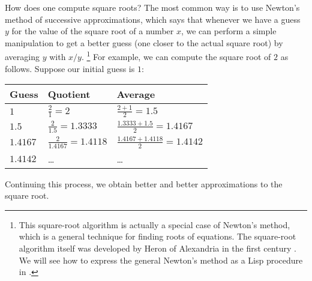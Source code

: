 How does one compute square roots?
The most common way is to use Newton’s method of successive approximations, which says that whenever we have a guess \( y \) for the value of the square root of a number \( x \), we can perform a simple manipulation to get a better guess (one closer to the actual square root) by averaging \( y \) with \( x / y \).%
\footnote{
	This square-root algorithm is actually a special case of Newton’s method, which is a general technique for finding roots of equations.
	The square-root algorithm itself was developed by Heron of Alexandria in the first century .
	We will see how to express the general Newton’s method as a Lisp procedure in .
}
For example, we can compute the square root of \( 2 \) as follows.
Suppose our initial guess is \( 1 \):
\begin{center}
	\begingroup
	\renewcommand{\arraystretch}{2}
	\begin{tabular}{l>{\quad}l>{\quad}l}
		Guess        & Quotient                        & Average                                  \\
		\midrule
		\( 1 \)      & \( \frac{2}{1} = 2 \)           & \( \frac{2 + 1}{2} = 1.5 \)              \\
		\( 1.5 \)    & \( \frac{2}{1.5} = 1.3333 \)    & \( \frac{1.3333 + 1.5}{2} = 1.4167 \)    \\
		\( 1.4167 \) & \( \frac{2}{1.4167} = 1.4118 \) & \( \frac{1.4167 + 1.4118}{2} = 1.4142 \) \\
		\( 1.4142 \) & …                           & …
	\end{tabular}
	\endgroup
\end{center}
Continuing this process, we obtain better and better approximations to the square root.

